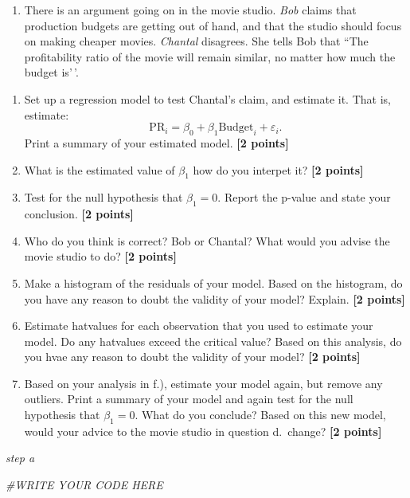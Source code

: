 \documentclass[
]{article}
\newenvironment{Shaded}{\begin{snugshade}}{\end{snugshade}}
\newcommand{\CommentTok}[1]{\textcolor[rgb]{0.56,0.35,0.01}{\textit{#1}}}
\providecommand{\tightlist}{%
  \setlength{\itemsep}{0pt}\setlength{\parskip}{0pt}}
\begin{document}
\begin{enumerate}
\def\labelenumi{\arabic{enumi}.}
\tightlist
\item
  There is an argument going on in the movie studio. \emph{Bob} claims
  that production budgets are getting out of hand, and that the studio
  should focus on making cheaper movies. \emph{Chantal} disagrees. She
  tells Bob that ``The profitability ratio of the movie will remain
  similar, no matter how much the budget is'\,'.
\end{enumerate}

\begin{enumerate}
\def\labelenumi{\alph{enumi}.}
\tightlist
\item
  Set up a regression model to test Chantal's claim, and estimate it.
  That is, estimate:
  \[\text{PR}_i=\beta_0+\beta_1 \text{Budget}_i +\varepsilon_i.\] Print
  a summary of your estimated model. \textbf{[2 points]}
\item
  What is the estimated value of \(\beta_1\) how do you interpet it?
  \textbf{[2 points]}
\item
  Test for the null hypothesis that \(\beta_1 = 0\). Report the p-value
  and state your conclusion. \textbf{[2 points]}
\item
  Who do you think is correct? Bob or Chantal? What would you advise the
  movie studio to do? \textbf{[2 points]}
\item
  Make a histogram of the residuals of your model. Based on the
  histogram, do you have any reason to doubt the validity of your model?
  Explain. \textbf{[2 points]}
\item
  Estimate hatvalues for each observation that you used to estimate your
  model. Do any hatvalues exceed the critical value? Based on this
  analysis, do you hvae any reason to doubt the validity of your model?
  \textbf{[2 points]}
\item
  Based on your analysis in f.), estimate your model again, but remove
  any outliers. Print a summary of your model and again test for the
  null hypothesis that \(\beta_1 = 0\). What do you conclude? Based on
  this new model, would your advice to the movie studio in question
  d.~change? \textbf{[2 points]}
\end{enumerate}

\emph{step a}

\begin{Shaded}
\begin{Highlighting}[]
\CommentTok{\#WRITE YOUR CODE HERE}
\end{Highlighting}
\end{Shaded}
\end{document}
